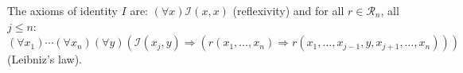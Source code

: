 The axioms of identity $I$ are: $(\forall x) \mathcal{I}(x, x)$ (reflexivity) and for all $r \in \mathcal{R}_n$, all $j \leq n$: $(\forall x_1)\cdots(\forall x_n)(\forall y)(\mathcal{I}(x_j, y) \Rightarrow (r(x_1,\ldots,x_n) \Rightarrow r(x_1,\ldots,x_{j-1},y,x_{j+1},\ldots,x_n)))$ (Leibniz's law).
